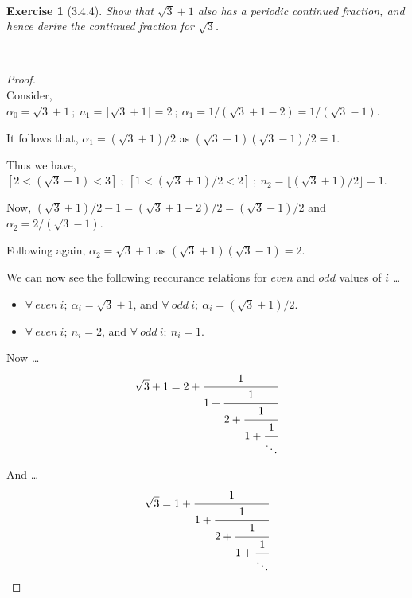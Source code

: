 \documentclass[12pt]{article}
\newcommand{\XB}{\color{black}}
\newcommand{\XBB}{\color{blue}}
\theoremstyle{plain}
\newtheorem{ex}{Exercise}
\begin{document}
\newpage

\XBB\hrulefill\XB \\
\begin{ex} [3.4.4]
  Show that $\sqrt{3}+1$ also has a periodic continued fraction, and hence derive the continued fraction for $\sqrt{3}$.
\end{ex}
\XBB\hrulefill\XB \\

\begin{proof}
  \ \\

  Consider, $ \alpha_{0} = \sqrt{3} + 1 \ ; \ n_{1} = \lfloor \sqrt{3} + 1 \rfloor = 2 \ ; \ \alpha_{1} = 1/(\sqrt{3} + 1 - 2) = 1/(\sqrt{3} - 1) $.

  It follows that, $ \alpha_{1} = (\sqrt{3} + 1)/2 $ as $ (\sqrt{3} + 1)(\sqrt{3} - 1)/2 = 1 $.

  Thus we have, $ [2 < (\sqrt{3} + 1) < 3] \ ; \ [1 < (\sqrt{3} + 1)/2 < 2] \ ; \ n_{2} = \lfloor (\sqrt{3} + 1)/2 \rfloor = 1 $.

  Now, $ (\sqrt{3} + 1)/2 - 1 = (\sqrt{3} + 1 - 2)/2 = (\sqrt{3} - 1)/2 $ and $ \alpha_{2} = 2/(\sqrt{3} - 1) $.

  Following again, $ \alpha_{2} = \sqrt{3} + 1 $ as $ (\sqrt{3} + 1)(\sqrt{3} - 1) = 2 $.

  We can now see the following reccurance relations for $even$ and $odd$ values of $ i $ \dots

  \begin{itemize}
    \item $ \forall \ even \ i ; \ \alpha_{i} = \sqrt{3} + 1 $, and $ \forall \ odd \ i ; \ \alpha_{i} = (\sqrt{3} + 1)/2 $.
    \item $ \forall \ even \ i ; \ n_{i} = 2 $, and $ \forall \ odd \ i ; \ n_{i} = 1 $.
  \end{itemize}

  Now \dots
  \[
    \sqrt{3} + 1 = 2 + \cfrac{1}{1 + \cfrac{1}{2 + \cfrac{1}{1 + \cfrac{1}{\ddots}}}}
  \]

  And \dots
  \[
    \sqrt{3} = 1 + \cfrac{1}{1 + \cfrac{1}{2 + \cfrac{1}{1 + \cfrac{1}{\ddots}}}}
  \]
\end{proof}
\end{document}
